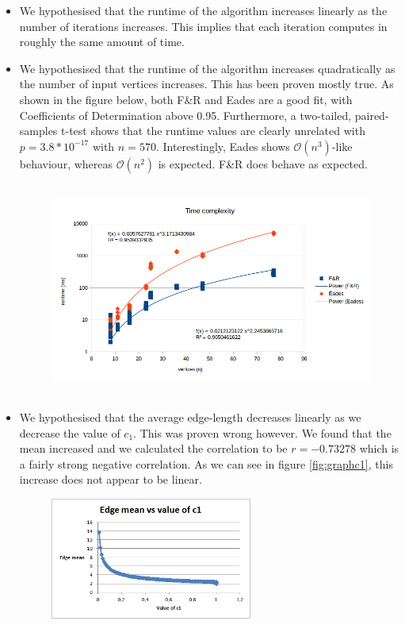 \documentclass[a4paper,12pt]{article}
\begin{document}
\begin{itemize}
\item We hypothesised that the runtime of the algorithm increases linearly as the number of iterations increases. This implies that each iteration computes in roughly the same amount of time.
\item We hypothesised that the runtime of the algorithm increases quadratically as the number of input vertices increases. This has been proven mostly true. As shown in the figure below, both F\&R and Eades are a good fit, with Coefficients of Determination above 0.95. Furthermore, a two-tailed, paired-samples t-test shows that the runtime values are clearly unrelated with $p = 3.8 * 10^{-17}$ with $n = 570$. Interestingly, Eades shows $\mathcal{O}(n^3)$-like behaviour, whereas $\mathcal{O}(n^2)$ is expected. F\&R does behave as expected.
\begin{figure}[h]
  \centering
  \includegraphics[height=7cm]{timecomplexity}
  \label{fig:timecomplexity}
\end{figure}
\item We hypothesised that the average edge-length decreases linearly as we decrease the value of $c_1$. This was proven wrong however. We found that the mean increased and we calculated the correlation to be $r=-0.73278$ which is a fairly strong negative correlation. As we can see in figure \ref{fig:graphc1}, this increase does not appear to be linear.
\begin{figure}[h]
	\centering
	\includegraphics[height=4cm]{Edgemeanvsc1}

\end{figure}
\end{itemize}
\end{document}
